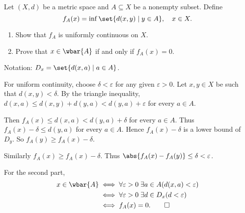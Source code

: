 \documentclass[12pt]{article}
\begin{document}
\begin{problem*}
    Let $(X, d)$ be a metric space and $A \subseteq X$ be a nonempty subset.
    Define \[
        f_A(x) = \inf\set{d(x, y) \mid y \in A}, \quad x \in X.
    \]
    \begin{enumerate}[label=(\alph*)]
        \item Show that $f_A$ is uniformly continuous on $X$.
        \item Prove that $x \in \wbar{A}$ if and only if $f_A(x) = 0$.
    \end{enumerate}
\end{problem*}
\begin{solution}
    Notation: $D_x = \set{d(x, a) \mid a \in A}$.

    For uniform continuity, choose $\delta < \varepsilon$ for any given
    $\varepsilon > 0$.
    Let $x, y \in X$ be such that $d(x, y) < \delta$.
    By the triangle inequality, $d(x, a) \le d(x, y) + d(y, a)
    < d(y, a) + \varepsilon$ for every $a \in A$.

    Then $f_A(x) \le d(x, a) < d(y, a) + \delta$ for every $a \in A$.
    Thus $f_A(x) - \delta \le d(y, a)$ for every $a \in A$.
    Hence $f_A(x) - \delta$ is a lower bound of $D_y$.
    So $f_A(y) \ge f_A(x) - \delta$.

    Similarly $f_A(x) \ge f_A(x) - \delta$.
    Thus $\abs{f_A(x) - f_A(y)} \le \delta < \varepsilon$.

    For the second part, \begin{align*}
        x \in \wbar{A}
        &\iff \forall \varepsilon > 0 \;\exists a \in A (d(x, a) < \varepsilon) \\
        &\iff \forall \varepsilon > 0 \;\exists d \in D_x (d < \varepsilon) \\
        &\iff f_A(x) = 0. \qedhere
    \end{align*}
\end{solution}
\end{document}
